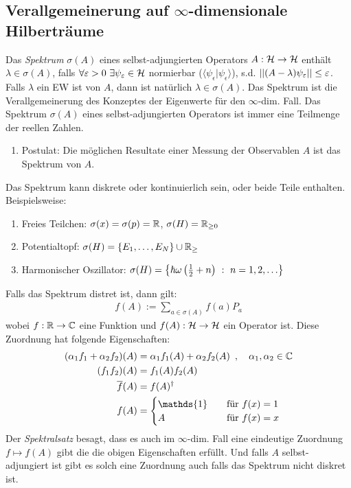 \subsection{Verallgemeinerung auf $\infty$-dimensionale Hilberträume}

Das \textit{Spektrum} $\sigma(A)$ eines selbst-adjungierten Operators
$A: \mathcal{H} \rightarrow \mathcal{H}$ enthält $\lambda \in \sigma(A)$, falls $\forall \varepsilon > 0
\ \exists \psi_\varepsilon \in \mathcal{H}$ normierbar ($\langle \psi_\epsilon | \psi_\epsilon \rangle$),
s.d. $\left\vert\left\vert (A - \lambda) \psi_\varepsilon \right\vert\right\vert \leq \varepsilon$. Falls $\lambda$ ein EW ist
von $A$, dann ist natürlich $\lambda \in \sigma(A)$. Das Spektrum ist die
Verallgemeinerung des Konzeptes der Eigenwerte für den $\infty$-dim. Fall.
Das Spektrum $\sigma(A)$ eines selbst-adjungierten Operators ist immer eine
Teilmenge der reellen Zahlen.
\begin{enumerate}[]
    \item Postulat: Die möglichen Resultate einer Messung der Observablen $A$
        ist das Spektrum von $A$.
\end{enumerate}
Das Spektrum kann diskrete oder kontinuierlich sein, oder beide Teile enthalten.
Beispielsweise:
\begin{enumerate}[]
    \item Freies Teilchen: $\sigma(x) = \sigma(p) = \mathbb{R}$, $\sigma(H) = \mathbb{R}_{\geq 0}$
    \item Potentialtopf: $\sigma(H) = \left\{ E_1,\dots,E_N \right\} \cup \mathbb{R}_{\geq}$
    \item Harmonischer Oszillator: $\sigma(H) = \geschwungeneklammer{\hbar \omega \klammer{\frac{1}{2} + n} \ : \ n=1,2,\dots}$
\end{enumerate}

Falls das Spektrum distret ist, dann gilt:
\begin{align*}
    f(A) := \sum_{a \in \sigma(A)} f(a) P_a
\end{align*}
wobei $f: \mathbb{R}\rightarrow \mathbb{C}$ eine Funktion und $f(A): \mathcal{H} \rightarrow \mathcal{H}$ ein
Operator ist. Diese Zuordnung hat folgende Eigenschaften:
\begin{align*}
    (\alpha_1 f_1 + \alpha_2 f_2)(A) &= \alpha_1 f_1 (A) + \alpha_2 f_2(A)
    \hspace{5pt} , \hspace{10pt} \alpha_1 , \alpha_2 \in \C
    \\
    (f_1 f_2)(A) &= f_1(A) f_2(A)
    \\
    \overline{f}(A) &= f(A)^\dagger
    \\
    f(A) &= \begin{cases}
        \mathds{1} \hspace{10pt} &\text{für } f(x) = 1
        \\
        A \hspace{10pt} &\text{für } f(x) = x
    \end{cases}
\end{align*}
Der \textit{Spektralsatz} besagt, dass es auch im $\infty$-dim. Fall eine eindeutige
Zuordnung $f \mapsto f(A)$ gibt die die obigen Eigenschaften erfüllt. Und
falls $A$ selbst-adjungiert ist gibt es solch eine Zuordnung auch falls das
Spektrum nicht diskret ist.

